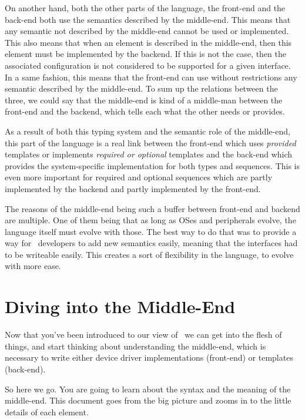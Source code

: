 \documentclass[american]{rtxreport}
\begin{document}
On another hand, both the other parts of the language, the front-end and the
back-end both use the semantics described by the middle-end. This means that
any semantic not described by the middle-end cannot be used or implemented.
This also means that when an element is described in the middle-end, then
this element must be implemented by the backend. If this is not the case,
then the associated configuration is not considered to be supported for
a given interface. In a same fashion, this means that the front-end can use
without restrictions any semantic described by the middle-end. To sum up
the relations between the three, we could say that the middle-end is kind
of a middle-man between the front-end and the backend, which tells each
what the other needs or provides.

As a result of both this typing system and the semantic role of the middle-end,
this part of the language is a real link between the front-end which uses
\emph{provided} templates or implements \emph{required or optional} templates
and the back-end which provides the system-specific implementation for both
types and sequences. This is even more important for required and optional
sequences which are partly implemented by the backend and partly implemented
by the front-end.

The reasons of the middle-end being such a buffer between front-end and
backend are multiple. One of them being that as long as OSes and peripherals
evolve, the language itself must evolve with those. The best way to do that
was to provide a way for \rtx\ developers to add new semantics easily,
meaning that the interfaces had to be writeable easily. This creates a
sort of flexibility in the language, to evolve with more ease.


\chapter{Diving into the Middle-End}


Now that you've been introduced to our view of \rtx\, we can get into the
flesh of things, and start thinking about understanding the middle-end, which
is necessary to write either device driver implementations (front-end) or
templates (back-end).

So here we go. You are going to learn about the syntax and the meaning of
the middle-end. This document goes from the big picture and zooms in to the
little details of each element.
\end{document}
